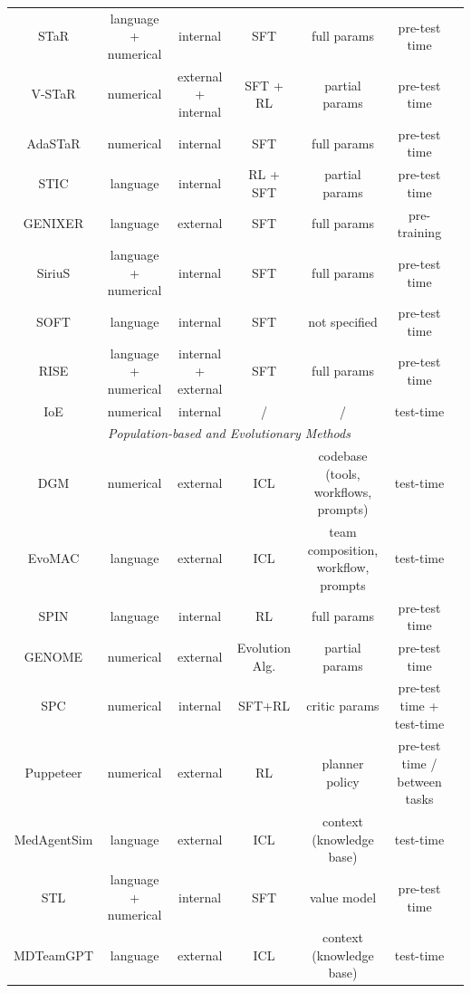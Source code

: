 \begin{table}[!t]
{\begin{tabular}{ccccccc}
STaR\citep{zelikman2022star} & language + numerical & internal & SFT & full params & pre-test time  \\
V-STaR\citep{hosseini2024v} & numerical & external + internal & SFT + RL & partial params & pre-test time \\
AdaSTaR\citep{koh2025adastar} & numerical & internal & SFT & full params  & pre-test time \\
STIC\citep{deng2024enhancing} & language & internal & RL + SFT & partial params & pre-test time \\
GENIXER\citep{zhao2024genixer}& language & external & SFT & full params & pre-training  \\
SiriuS\citep{zhao2025sirius} & language + numerical & internal & SFT & full params & pre-test time \\
SOFT\citep{tang2025bridging} & language & internal & SFT & not specified & pre-test time \\
RISE\citep{qu2024recursive} & language + numerical & internal + external & SFT & full params & pre-test time  \\
IoE\citep{li2024confidence} & numerical & internal & / & / & test-time \\\midrule
\multicolumn{6}{c}{\textit{Population-based and Evolutionary Methods}} \\\midrule
DGM\citep{zhang2025darwin} & numerical & external & ICL & codebase (tools, workflows, prompts) & test-time \\
EvoMAC\citep{hu2024self} & language & external & ICL & team composition, workflow, prompts & test-time \\
SPIN\citep{chen2024self} & language & internal & RL & full params & pre-test time \\
GENOME\citep{zhang2025nature} & numerical & external & Evolution Alg. & partial params & pre-test time \\
SPC\citep{chen2025spc} & numerical & internal & SFT+RL & critic params & pre-test time + test-time \\
Puppeteer\citep{dang2025multi} & numerical & external & RL & planner policy & pre-test time / between tasks \\
MedAgentSim\citep{almansoori2025self} & language & external & ICL & context (knowledge base) & test-time \\
STL\citep{mendes2025language} & language + numerical & internal & SFT & value model & pre-test time \\
MDTeamGPT\citep{chen2025self} & language & external & ICL & context (knowledge base) & test-time \\
\bottomrule
\end{tabular}
}
\label{tab:imitation_learning}
\end{table}






